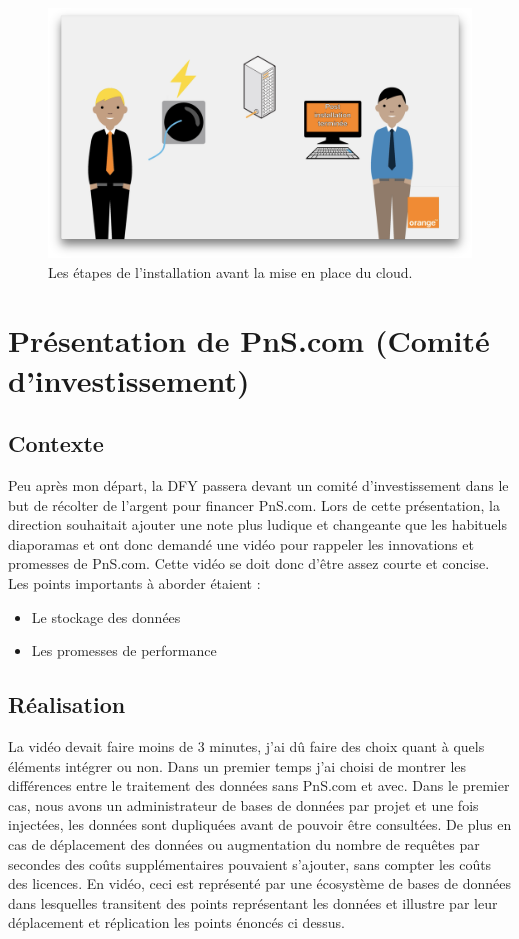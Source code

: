 \begin{figure}[htp]
  \centering
  \includegraphics[width=15cm]{images/cd/cd.png}
  \caption{Les étapes de l'installation avant la mise en place du cloud.}
  \label{comite}
\end{figure}



\section{Présentation de PnS.com (Comité d'investissement)}
\subsection{Contexte}
Peu après mon départ, la DFY passera devant un comité d'investissement dans le but de récolter de l'argent pour financer PnS.com. Lors de cette présentation, la direction souhaitait ajouter une note plus ludique et changeante que les habituels diaporamas et ont donc demandé une vidéo pour rappeler les innovations et promesses de PnS.com. Cette vidéo se doit donc d'être assez courte et concise. Les points importants à aborder étaient : 
\begin{itemize}
\item Le stockage des données
\item Les promesses de performance
\end{itemize}




\subsection{Réalisation}
La vidéo devait faire moins de 3 minutes, j'ai dû faire des choix quant à quels éléments intégrer ou non. Dans un premier temps j'ai choisi de montrer les différences entre le traitement des données sans PnS.com et avec. Dans le premier cas, nous avons un administrateur de bases de données par projet et une fois injectées, les données sont dupliquées avant de pouvoir être consultées. De plus en cas de déplacement des données ou augmentation du nombre de requêtes par secondes des coûts supplémentaires pouvaient s'ajouter, sans compter les coûts des licences. En vidéo, ceci est représenté par une écosystème de bases de données dans lesquelles transitent des points représentant les données et illustre par leur déplacement et réplication les points énoncés ci dessus.\\

